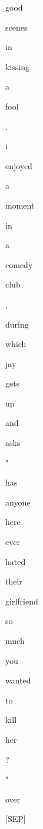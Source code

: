 \documentclass[varwidth=150mm]{standalone}
\begin{document}
\begin{CJK*}{UTF8}{gbsn}
{{{\colorbox{red!1.9778839349746704}{\strut good} \colorbox{red!14.09386920928955}{\strut scenes} \colorbox{red!8.561714172363281}{\strut in} \colorbox{red!5.357694625854492}{\strut kissing} \colorbox{red!0.0}{\strut a} \colorbox{red!31.249156951904297}{\strut fool} \colorbox{red!1.6727386713027954}{\strut .} \colorbox{red!37.66115951538086}{\strut i} \colorbox{red!1.9726394414901733}{\strut enjoyed} \colorbox{red!4.568064212799072}{\strut a} \colorbox{red!0.0}{\strut moment} \colorbox{red!4.374474048614502}{\strut in} \colorbox{red!3.5119707584381104}{\strut a} \colorbox{red!21.035188674926758}{\strut comedy} \colorbox{red!0.0}{\strut club} \colorbox{red!1.0065997838974}{\strut ,} \colorbox{red!2.044528007507324}{\strut during} \colorbox{red!11.953829765319824}{\strut which} \colorbox{red!36.931095123291016}{\strut jay} \colorbox{red!3.559267520904541}{\strut gets} \colorbox{red!1.8553733825683594}{\strut up} \colorbox{red!15.706342697143555}{\strut and} \colorbox{red!15.729897499084473}{\strut asks} \colorbox{red!7.010091781616211}{\strut "} \colorbox{red!3.447683572769165}{\strut has} \colorbox{red!4.309287071228027}{\strut anyone} \colorbox{red!37.80238342285156}{\strut here} \colorbox{red!5.344031810760498}{\strut ever} \colorbox{red!12.31511116027832}{\strut hated} \colorbox{red!0.0}{\strut their} \colorbox{red!7.162267208099365}{\strut girlfriend} \colorbox{red!0.0}{\strut so} \colorbox{red!1.0473445653915405}{\strut much} \colorbox{red!0.0}{\strut you} \colorbox{red!0.0}{\strut wanted} \colorbox{red!0.0}{\strut to} \colorbox{red!0.0}{\strut kill} \colorbox{red!0.0}{\strut her} \colorbox{red!3.3238866329193115}{\strut ?} \colorbox{red!16.465179443359375}{\strut "} \colorbox{red!49.652793884277344}{\strut over} \colorbox{red!2.48974609375}{\strut [SEP]}
}}}
\end{CJK*}
\end{document}
